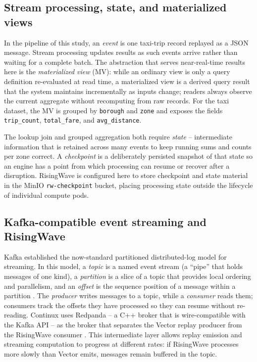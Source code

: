 \subsection{Stream processing, state, and materialized views}
In the pipeline of this study, an \emph{event} is one taxi-trip record replayed as a JSON message. Stream processing updates results as such events arrive rather than waiting for a complete batch. The abstraction that serves near-real-time results here is the \emph{materialized view} (MV): while an ordinary view is only a query definition re-evaluated at read time, a materialized view is a derived query result that the system maintains incrementally as inputs change; readers always observe the current aggregate without recomputing from raw records. For the taxi dataset, the MV is grouped by \texttt{borough} and \texttt{zone} and exposes the fields \texttt{trip\_count}, \texttt{total\_fare}, and \texttt{avg\_distance}.

The lookup join and grouped aggregation both require \emph{state} -- intermediate information that is retained across many events to keep running sums and counts per zone correct. A \emph{checkpoint} is a deliberately persisted snapshot of that state so an engine has a point from which processing can resume or recover after a disruption. RisingWave is configured here to store checkpoint and state material in the MinIO \texttt{rw-checkpoint} bucket, placing processing state outside the lifecycle of individual compute pods.

\subsection{Kafka-compatible event streaming and RisingWave}
Kafka established the now-standard partitioned distributed-log model for streaming. In this model, a \emph{topic} is a named event stream (a ``pipe'' that holds messages of one kind), a \emph{partition} is a slice of a topic that provides local ordering and parallelism, and an \emph{offset} is the sequence position of a message within a partition \parencite{kreps2011kafka}. The \emph{producer} writes messages to a topic, while a \emph{consumer} reads them; consumers track the offsets they have processed so they can resume without re-reading. Continux uses Redpanda -- a C++ broker that is wire-compatible with the Kafka API -- as the broker that separates the Vector replay producer from the RisingWave consumer \parencite{redpandadocs}. This intermediate layer allows replay emission and streaming computation to progress at different rates: if RisingWave processes more slowly than Vector emits, messages remain buffered in the topic.

